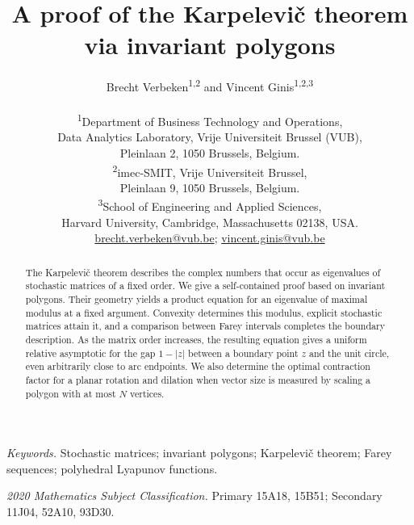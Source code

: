 \documentclass[11pt,a4paper]{article}
\theoremstyle{definition}
\theoremstyle{remark}
\numberwithin{equation}{section}
\begin{document}
\title{A proof of the Karpelevi\v{c} theorem via invariant polygons}
\author{%
  Brecht Verbeken\textsuperscript{1,2} and
  Vincent Ginis\textsuperscript{1,2,3}\\[0.8em]
  \parbox{0.96\textwidth}{\centering\small
    \textsuperscript{1}Department of Business Technology and Operations,\\
    Data Analytics Laboratory, Vrije Universiteit Brussel (VUB),\\
    Pleinlaan 2, 1050 Brussels, Belgium.\\[0.45em]
    \textsuperscript{2}imec-SMIT, Vrije Universiteit Brussel,\\
    Pleinlaan 9, 1050 Brussels, Belgium.\\[0.45em]
    \textsuperscript{3}School of Engineering and Applied Sciences,\\
    Harvard University, Cambridge, Massachusetts 02138, USA.\\[0.6em]
    \href{mailto:brecht.verbeken@vub.be}{brecht.verbeken@vub.be};
    \href{mailto:vincent.ginis@vub.be}{vincent.ginis@vub.be}
  }%
}
\date{}
\maketitle
\begin{abstract}
The Karpelevi\v{c} theorem describes the complex numbers that occur as
eigenvalues of stochastic matrices of a fixed order. We give a
self-contained proof based on invariant polygons. Their geometry yields
a product equation for an eigenvalue of maximal modulus at a fixed
argument. Convexity determines this modulus, explicit stochastic
matrices attain it, and a comparison between Farey intervals completes
the boundary description. As the matrix order increases, the resulting
equation gives a uniform relative asymptotic for the gap $1-|z|$ between
a boundary point $z$ and the unit circle, even arbitrarily close to arc
endpoints. We also determine the optimal contraction factor for a planar
rotation and dilation when vector size is measured by scaling a polygon
with at most $N$ vertices.
\end{abstract}

\noindent\textit{Keywords.} Stochastic matrices; invariant polygons;
Karpelevi\v{c} theorem; Farey sequences; polyhedral Lyapunov functions.\par
\noindent\textit{2020 Mathematics Subject Classification.}
Primary 15A18, 15B51; Secondary 11J04, 52A10, 93D30.
\end{document}

